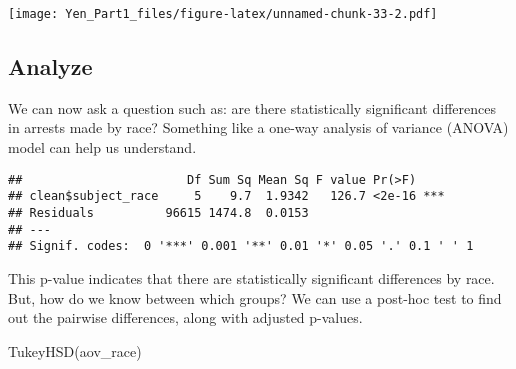 \documentclass[
]{article}
\newenvironment{Shaded}{\begin{snugshade}}{\end{snugshade}}
\newcommand{\FunctionTok}[1]{\textcolor[rgb]{0.00,0.00,0.00}{#1}}
\newcommand{\NormalTok}[1]{#1}
\newcommand{\OtherTok}[1]{\textcolor[rgb]{0.56,0.35,0.01}{#1}}
\newcommand{\SpecialCharTok}[1]{\textcolor[rgb]{0.00,0.00,0.00}{#1}}
\begin{document}
\texttt{[image: Yen\_Part1\_files/figure-latex/unnamed-chunk-33-2.pdf]}

\hypertarget{analyze}{%
\subsection{Analyze}\label{analyze}}

We can now ask a question such as: are there statistically significant
differences in arrests made by race? Something like a one-way analysis
of variance (ANOVA) model can help us understand.

\begin{Shaded}
\end{Shaded}

\begin{verbatim}
##                       Df Sum Sq Mean Sq F value Pr(>F)    
## clean$subject_race     5    9.7  1.9342   126.7 <2e-16 ***
## Residuals          96615 1474.8  0.0153                   
## ---
## Signif. codes:  0 '***' 0.001 '**' 0.01 '*' 0.05 '.' 0.1 ' ' 1
\end{verbatim}

This p-value indicates that there are statistically significant
differences by race. But, how do we know between which groups? We can
use a post-hoc test to find out the pairwise differences, along with
adjusted p-values.

\begin{Shaded}
\begin{Highlighting}[]
\FunctionTok{TukeyHSD}\NormalTok{(aov\_race)}
\end{Highlighting}
\end{Shaded}
\end{document}
